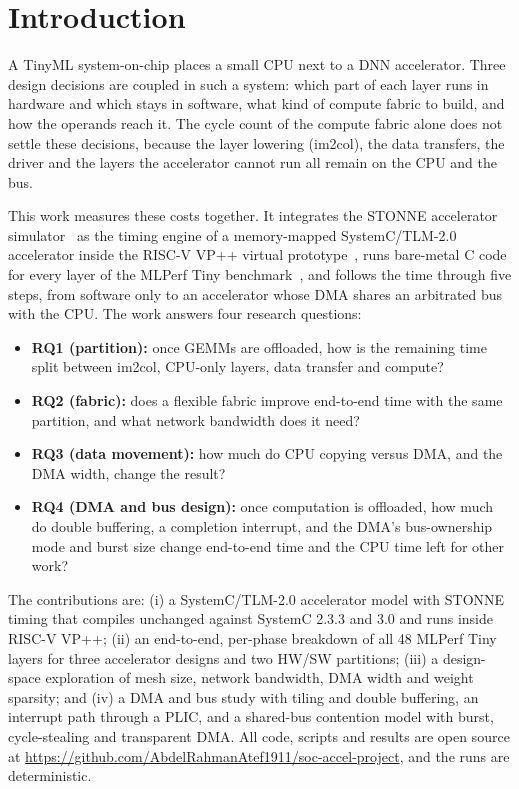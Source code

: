 \documentclass[conference]{IEEEtran}
\begin{document}
\section{Introduction}
A TinyML system-on-chip places a small CPU next to a DNN accelerator. Three design decisions are coupled in such a system: which part of each layer runs in hardware and which stays in software, what kind of compute fabric to build, and how the operands reach it. The cycle count of the compute fabric alone does not settle these decisions, because the layer lowering (im2col), the data transfers, the driver and the layers the accelerator cannot run all remain on the CPU and the bus.

This work measures these costs together. It integrates the STONNE accelerator simulator~\cite{stonne_cal,stonne_iiswc} as the timing engine of a memory-mapped SystemC/TLM-2.0 accelerator inside the RISC-V VP++ virtual prototype~\cite{riscv_vp_jsa,riscv_vppp}, runs bare-metal C code for every layer of the MLPerf Tiny benchmark~\cite{mlperf_tiny}, and follows the time through five steps, from software only to an accelerator whose DMA shares an arbitrated bus with the CPU. The work answers four research questions:
\begin{itemize}
\item \textbf{RQ1 (partition):} once GEMMs are offloaded, how is the remaining time split between im2col, CPU-only layers, data transfer and compute?
\item \textbf{RQ2 (fabric):} does a flexible fabric improve end-to-end time with the same partition, and what network bandwidth does it need?
\item \textbf{RQ3 (data movement):} how much do CPU copying versus DMA, and the DMA width, change the result?
\item \textbf{RQ4 (DMA and bus design):} once computation is offloaded, how much do double buffering, a completion interrupt, and the DMA's bus-ownership mode and burst size change end-to-end time and the CPU time left for other work?
\end{itemize}
The contributions are: (i) a SystemC/TLM-2.0 accelerator model with STONNE timing that compiles unchanged against SystemC 2.3.3 and 3.0 and runs inside RISC-V VP++; (ii) an end-to-end, per-phase breakdown of all 48 MLPerf Tiny layers for three accelerator designs and two HW/SW partitions; (iii) a design-space exploration of mesh size, network bandwidth, DMA width and weight sparsity; and (iv) a DMA and bus study with tiling and double buffering, an interrupt path through a PLIC, and a shared-bus contention model with burst, cycle-stealing and transparent DMA. All code, scripts and results are open source at \url{https://github.com/AbdelRahmanAtef1911/soc-accel-project}, and the runs are deterministic.
\end{document}
